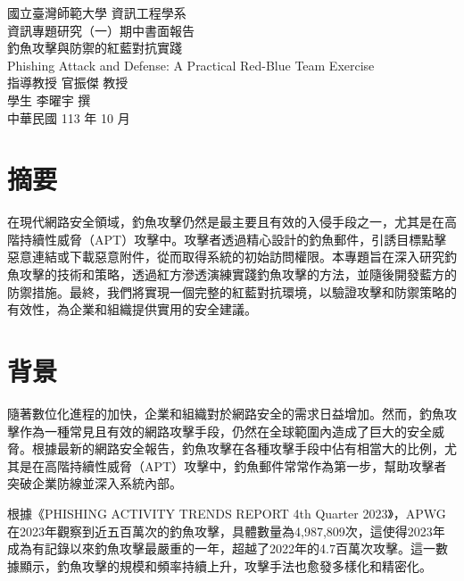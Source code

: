 \documentclass[a4paper,12pt]{article}
\begin{document}
\begin{titlepage}
  \begin{center}
    \vspace*{2cm}
    {\fontsize{16pt}{16pt}\selectfont 國立臺灣師範大學 資訊工程學系}\\[1cm]
    {\fontsize{16pt}{16pt} 資訊專題研究（一）期中書面報告}\\[4cm]
    {\fontsize{16pt}{16pt}\selectfont 釣魚攻擊與防禦的紅藍對抗實踐}\\[1cm]
    {\fontsize{16pt}{16pt}\selectfont Phishing Attack and Defense: A Practical Red-Blue Team Exercise}\\[9cm]
    {\fontsize{12pt}{12pt}\selectfont 指導教授 官振傑 教授}\\[0.5cm]
    {\fontsize{12pt}{12pt}\selectfont 學生 李曜宇 撰}\\[0.5cm]
    {\fontsize{12pt}{12pt}\selectfont 中華民國 113 年 10 月}
  \end{center}
\end{titlepage}

\newpage

\section*{摘要}
在現代網路安全領域，釣魚攻擊仍然是最主要且有效的入侵手段之一，尤其是在高階持續性威脅（APT）攻擊中。攻擊者透過精心設計的釣魚郵件，引誘目標點擊惡意連結或下載惡意附件，從而取得系統的初始訪問權限。本專題旨在深入研究釣魚攻擊的技術和策略，透過紅方滲透演練實踐釣魚攻擊的方法，並隨後開發藍方的防禦措施。最終，我們將實現一個完整的紅藍對抗環境，以驗證攻擊和防禦策略的有效性，為企業和組織提供實用的安全建議。

\section{背景}
隨著數位化進程的加快，企業和組織對於網路安全的需求日益增加。然而，釣魚攻擊作為一種常見且有效的網路攻擊手段，仍然在全球範圍內造成了巨大的安全威脅。根據最新的網路安全報告，釣魚攻擊在各種攻擊手段中佔有相當大的比例，尤其是在高階持續性威脅（APT）攻擊中，釣魚郵件常常作為第一步，幫助攻擊者突破企業防線並深入系統內部。

根據《PHISHING ACTIVITY TRENDS REPORT 4th Quarter 2023》\cite{apwg2023}，APWG 在2023年觀察到近五百萬次的釣魚攻擊，具體數量為4,987,809次，這使得2023年成為有記錄以來釣魚攻擊最嚴重的一年，超越了2022年的4.7百萬次攻擊。這一數據顯示，釣魚攻擊的規模和頻率持續上升，攻擊手法也愈發多樣化和精密化。
\end{document}
